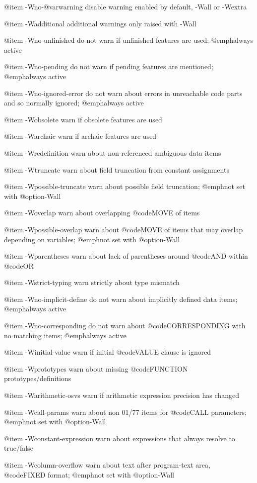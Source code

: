 @item -Wno-@var{warning}
disable warning enabled by default, -Wall or -Wextra

@item -Wadditional
additional warnings only raised with -Wall

@item -Wno-unfinished
do not warn if unfinished features are used; @emph{always} active

@item -Wno-pending
do not warn if pending features are mentioned; @emph{always} active

@item -Wno-ignored-error
do not warn about errors in unreachable code parts and so normally ignored; @emph{always} active

@item -Wobsolete
warn if obsolete features are used

@item -Warchaic
warn if archaic features are used

@item -Wredefinition
warn about non-referenced ambiguous data items

@item -Wtruncate
warn about field truncation from constant assignments

@item -Wpossible-truncate
warn about possible field truncation; @emph{not} set with @option{-Wall}

@item -Woverlap
warn about overlapping @code{MOVE} of items

@item -Wpossible-overlap
warn about @code{MOVE} of items that may overlap depending on variables; @emph{not} set with @option{-Wall}

@item -Wparentheses
warn about lack of parentheses around @code{AND} within @code{OR}

@item -Wstrict-typing
warn strictly about type mismatch

@item -Wno-implicit-define
do not warn about implicitly defined data items; @emph{always} active

@item -Wno-corresponding
do not warn about @code{CORRESPONDING} with no matching items; @emph{always} active

@item -Winitial-value
warn if initial @code{VALUE} clause is ignored

@item -Wprototypes
warn about missing @code{FUNCTION} prototypes/definitions

@item -Warithmetic-osvs
warn if arithmetic expression precision has changed

@item -Wcall-params
warn about non 01/77 items for @code{CALL} parameters; @emph{not} set with @option{-Wall}

@item -Wconstant-expression
warn about expressions that always resolve to true/false

@item -Wcolumn-overflow
warn about text after program-text area, @code{FIXED} format; @emph{not} set with @option{-Wall}

